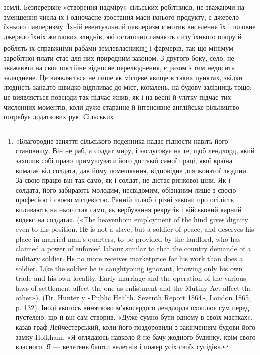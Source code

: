 \parcont{}  %
землі. Безперервне «створення надміру» сільських робітників,
не зважаючи на зменшення числа їх і одночасне зростання маси
їхнього продукту, є джерело їхнього павперизму. Їхній евентуальний
павперизм є мотив виселення їх і головне джерело їхніх житлових
злиднів, які остаточно ламають силу їхнього опору й роблять
їх справжніми рабами землевласників\footnote{
«Благородне заняття сільського поденника надає гідности навіть
його становищу. Він не раб, а солдат миру, і заслуговує на те, щоб лендлорд,
який захопив собі право примушувати його до такої самої праці,
якої країна вимагає від солдата, дав йому помешкання, відповідне для
жонатої людини. За свою працю він так само, як і солдат, не дістає ринкової
ціни. Як і солдата, його забирають молодим, несвідомим, обізнаним
лише з своєю професією і своєю місцевістю. Ранній шлюб і різні закони
про осілість впливають на нього так само, як вербування рекрутів і військовий
карний кодекс на солдата». («The heavenbom employment of
the hind gives dignity even to his position. Не is not a slave, but a soldier
of peace, and deserves his place in married man’s quarters, to be provided
by the landlord, who has claimed a power of enforced labour similar to that
the country demande of a military soldier. Не no more receives marketprice
for his work than does a soldier. Like the soldier he is caughtyoung
ignorant, knowing only his own trade and his own locality. Early marriage and
the operation of the various laws of settlement affect the one as enlistment
and the Mutiny Act affect the other»). (Dr. Hunter y «Public Health. Seventh
Report 1864», London 1865, p. 132). Іноді якогось винятково м’якосердого
лендлорда охоплює сум перед пустелею, що її він сам створив. «Дуже
сумно бути одному в своїх маєтках», казав граф Лейчестерський, коли
його поздоровили з закінченням будови його замку Holkham. «Я оглядаюсь
навколо й не бачу жодного будинку, крім свого власного. Я — велетень
башти велетнів і пожер усіх своїх сусідів».
} і фармерів, так що мінімум
заробітної плати стає для них природним законом. З другого
боку, село, не зважаючи на своє постійне відносне перелюднення,
є разом з тим недосить залюднене. Це виявляється не лише як
місцеве явище в таких пунктах, звідки людність занадто швидко
відпливає до міст, копалень, на будову залізниць тощо; це виявляється
повсюди так підчас жнив, як і на весні й улітку підчас
тих численних моментів, коли дуже старанне й інтенсивне
англійське рільництво потребує додаткових рук. Сільських
